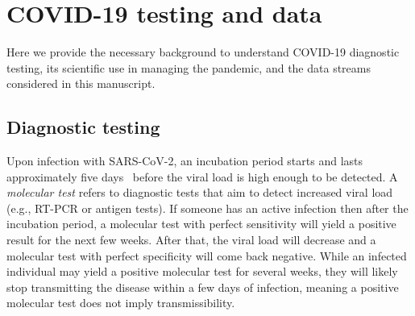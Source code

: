 \documentclass[11pt]{amsart}
\numberwithin{equation}{section}
\theoremstyle{plain}
\begin{document}



 \section{COVID-19 testing and data}
 \label{section:data}

 Here we provide the necessary background to understand COVID-19 diagnostic testing, its scientific use in managing the pandemic, and the data streams considered in this manuscript.

 \subsection{Diagnostic testing}
 \label{section:testinginfo}

 Upon infection with SARS-CoV-2, an incubation period starts and lasts approximately five days~\citep{Lauer2020} before the viral load is high enough to be detected.  A \emph{molecular test} refers to diagnostic tests that aim to detect increased viral load (e.g., RT-PCR or antigen tests).  If someone has an active infection then after the incubation period, a molecular test with perfect sensitivity will yield a positive result for the next few weeks.  After that, the viral load will decrease and a molecular test with perfect specificity will come back negative. While an infected individual may yield a positive molecular test for several weeks, they will likely stop transmitting the disease within a few days of infection, meaning a positive molecular test does not imply transmissibility.
\end{document}
